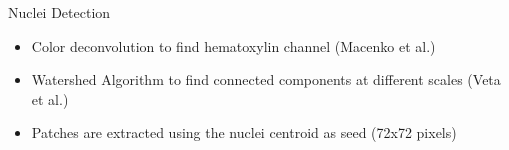 \documentclass[usenames,dvipsnames]{beamer}
\begin{document}

%
%    

%
%    




\begin{frame}{Nuclei Detection}

\begin{itemize}
    \item Color deconvolution to find hematoxylin channel (Macenko et al.)
    \item Watershed Algorithm to find connected components at different scales (Veta et al.)
    \item Patches are extracted using the nuclei centroid as seed (72x72 pixels)
\end{itemize}
    
\end{frame}
\end{document}
